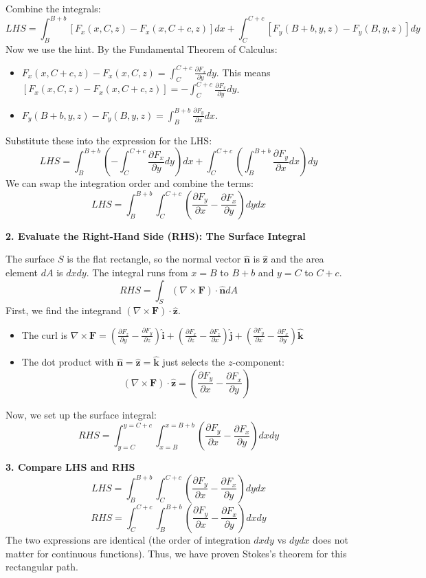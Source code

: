 \documentclass[11pt, a4paper]{article} %
\begin{document}
Combine the integrals:
$$LHS = \int_B^{B+b} \left[ F_x(x, C, z) - F_x(x, C+c, z) \right] dx + \int_C^{C+c} \left[ F_y(B+b, y, z) - F_y(B, y, z) \right] dy$$
Now we use the hint. By the Fundamental Theorem of Calculus:
\begin{itemize}
    \item $F_x(x, C+c, z) - F_x(x, C, z) = \int_C^{C+c} \frac{\partial F_x}{\partial y} dy$.
    This means $\left[ F_x(x, C, z) - F_x(x, C+c, z) \right] = - \int_C^{C+c} \frac{\partial F_x}{\partial y} dy$.
    \item $F_y(B+b, y, z) - F_y(B, y, z) = \int_B^{B+b} \frac{\partial F_y}{\partial x} dx$.
\end{itemize}
Substitute these into the expression for the LHS:
$$LHS = \int_B^{B+b} \left( - \int_C^{C+c} \frac{\partial F_x}{\partial y} dy \right) dx + \int_C^{C+c} \left( \int_B^{B+b} \frac{\partial F_y}{\partial x} dx \right) dy$$
We can swap the integration order and combine the terms:
$$LHS = \int_B^{B+b} \int_C^{C+c} \left( \frac{\partial F_y}{\partial x} - \frac{\partial F_x}{\partial y} \right) dy dx$$

\textbf{2. Evaluate the Right-Hand Side (RHS): The Surface Integral}

The surface $S$ is the flat rectangle, so the normal vector $\hat{\mathbf{n}}$ is $\hat{\mathbf{z}}$ and the area element $dA$ is $dx dy$. The integral runs from $x=B$ to $B+b$ and $y=C$ to $C+c$.
$$RHS = \int_S (\nabla \times \mathbf{F}) \cdot \hat{\mathbf{n}} dA$$
First, we find the integrand $(\nabla \times \mathbf{F}) \cdot \hat{\mathbf{z}}$.
\begin{itemize}
    \item The curl is $\nabla \times \mathbf{F} = \left( \frac{\partial F_z}{\partial y} - \frac{\partial F_y}{\partial z} \right) \hat{\mathbf{i}} + \left( \frac{\partial F_x}{\partial z} - \frac{\partial F_z}{\partial x} \right) \hat{\mathbf{j}} + \left( \frac{\partial F_y}{\partial x} - \frac{\partial F_x}{\partial y} \right) \hat{\mathbf{k}}$
    \item The dot product with $\hat{\mathbf{n}} = \hat{\mathbf{z}} = \hat{\mathbf{k}}$ just selects the $z$-component:
    $$(\nabla \times \mathbf{F}) \cdot \hat{\mathbf{z}} = \left( \frac{\partial F_y}{\partial x} - \frac{\partial F_x}{\partial y} \right)$$
\end{itemize}
Now, we set up the surface integral:
$$RHS = \int_{y=C}^{y=C+c} \int_{x=B}^{x=B+b} \left( \frac{\partial F_y}{\partial x} - \frac{\partial F_x}{\partial y} \right) dx dy$$

\textbf{3. Compare LHS and RHS}
$$LHS = \int_B^{B+b} \int_C^{C+c} \left( \frac{\partial F_y}{\partial x} - \frac{\partial F_x}{\partial y} \right) dy dx$$
$$RHS = \int_C^{C+c} \int_B^{B+b} \left( \frac{\partial F_y}{\partial x} - \frac{\partial F_x}{\partial y} \right) dx dy$$
The two expressions are identical (the order of integration $dx dy$ vs $dy dx$ does not matter for continuous functions). Thus, we have proven Stokes's theorem for this rectangular path.
\end{document}
